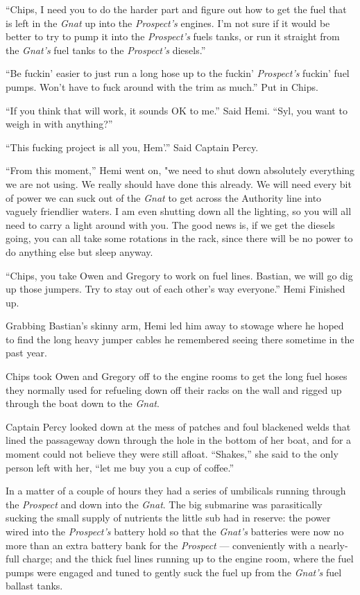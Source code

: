 \documentclass[]{scrbook}
\begin{document}
``Chips, I need you to do the harder part and figure out how to get the
fuel that is left in the \emph{Gnat} up into the \emph{Prospect's}
engines. I'm not sure if it would be better to try to pump it into the
\emph{Prospect's} fuels tanks, or run it straight from the \emph{Gnat's}
fuel tanks to the \emph{Prospect's} diesels.''

``Be fuckin' easier to just run a long hose up to the fuckin'
\emph{Prospect's} fuckin' fuel pumps. Won't have to fuck around with the
trim as much.'' Put in Chips.

``If you think that will work, it sounds OK to me.'' Said Hemi. ``Syl,
you want to weigh in with anything?''

``This fucking project is all you, Hem'.'' Said Captain Percy.

``From this moment,'' Hemi went on, "we need to shut down absolutely
everything we are not using. We really should have done this already. We
will need every bit of power we can suck out of the \emph{Gnat} to get
across the Authority line into vaguely friendlier waters. I am even
shutting down all the lighting, so you will all need to carry a light
around with you. The good news is, if we get the diesels going, you can
all take some rotations in the rack, since there will be no power to do
anything else but sleep anyway.

``Chips, you take Owen and Gregory to work on fuel lines. Bastian, we
will go dig up those jumpers. Try to stay out of each other's way
everyone.'' Hemi Finished up.

Grabbing Bastian's skinny arm, Hemi led him away to stowage where he
hoped to find the long heavy jumper cables he remembered seeing there
sometime in the past year.

Chips took Owen and Gregory off to the engine rooms to get the long fuel
hoses they normally used for refueling down off their racks on the wall
and rigged up through the boat down to the \emph{Gnat}.

Captain Percy looked down at the mess of patches and foul blackened
welds that lined the passageway down through the hole in the bottom of
her boat, and for a moment could not believe they were still afloat.
``Shakes,'' she said to the only person left with her, ``let me buy you
a cup of coffee.''

In a matter of a couple of hours they had a series of umbilicals running
through the \emph{Prospect} and down into the \emph{Gnat}. The big
submarine was parasitically sucking the small supply of nutrients the
little sub had in reserve: the power wired into the \emph{Prospect's}
battery hold so that the \emph{Gnat's} batteries were now no more than
an extra battery bank for the \emph{Prospect} --- conveniently with a
nearly-full charge; and the thick fuel lines running up to the engine
room, where the fuel pumps were engaged and tuned to gently suck the
fuel up from the \emph{Gnat's} fuel ballast tanks.
\end{document}
